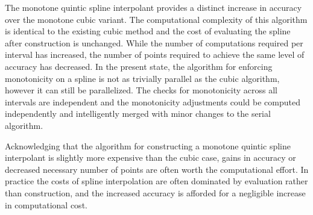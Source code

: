 


The monotone quintic spline interpolant provides a distinct increase in accuracy over the monotone cubic variant. The computational complexity of this algorithm is identical to the existing cubic method and the cost of evaluating the spline after construction is unchanged. While the number of computations required per interval has increased, the number of points required to achieve the same level of accuracy has decreased. In the present state, the algorithm for enforcing monotonicity on a spline is not as trivially parallel as the cubic algorithm, however it can still be parallelized. The checks for monotonicity across all intervals are independent and the monotonicity adjustments could be computed independently and intelligently merged with minor changes to the serial algorithm.

Acknowledging that the algorithm for constructing a monotone quintic spline interpolant is slightly more expensive than the cubic case, gains in accuracy or decreased necessary number of points are often worth the computational effort. In practice the costs of spline interpolation are often dominated by evaluation rather than construction, and the increased accuracy is afforded for a negligible increase in computational cost.

